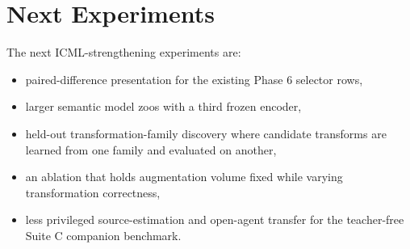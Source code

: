 \section{Next Experiments}

The next ICML-strengthening experiments are:
\begin{itemize}
  \item paired-difference presentation for the existing Phase 6 selector rows,
  \item larger semantic model zoos with a third frozen encoder,
  \item held-out transformation-family discovery where candidate transforms are
  learned from one family and evaluated on another,
  \item an ablation that holds augmentation volume fixed while varying
  transformation correctness,
  \item less privileged source-estimation and open-agent transfer for the
  teacher-free Suite C companion benchmark.
\end{itemize}
